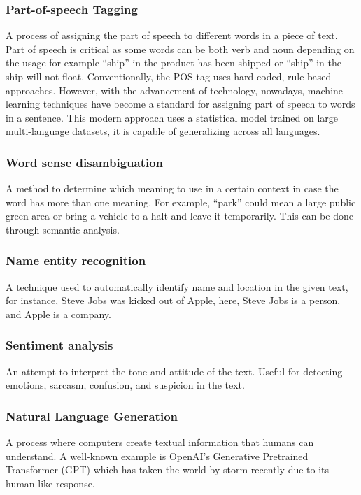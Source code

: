 \documentclass[12pt,oneside,openright,a4paper]{cpe-english-project}
\begin{document}
\subsubsection{Part-of-speech Tagging}
A process of assigning the part of speech to different words in a piece of text. Part of speech is critical as some words can be both verb and noun depending on the usage for example “ship” in the product has been shipped or “ship” in the ship will not float. Conventionally, the POS tag uses hard-coded, rule-based approaches. However, with the advancement of technology, nowadays, machine learning techniques have become a standard for assigning part of speech to words in a sentence. This modern approach uses a statistical model trained on large multi-language datasets, it is capable of generalizing across all languages.

\subsubsection{Word sense disambiguation}
A method to determine which meaning to use in a certain context in case the word has more than one meaning. For example, “park” could mean a large public green area or bring a vehicle to a halt and leave it temporarily. This can be done through semantic analysis.

\subsubsection{Name entity recognition}
A technique used to automatically identify name and location in the given text, for instance, Steve Jobs was kicked out of Apple, here, Steve Jobs is a person, and Apple is a company.

\subsubsection{Sentiment analysis}
An attempt to interpret the tone and attitude of the text. Useful for detecting emotions, sarcasm, confusion, and suspicion in the text.

\subsubsection{Natural Language Generation}
A process where computers create textual information that humans can understand. A well-known example is OpenAI’s Generative Pretrained Transformer (GPT) which has taken the world by storm recently due to its human-like response. 
\end{document}
